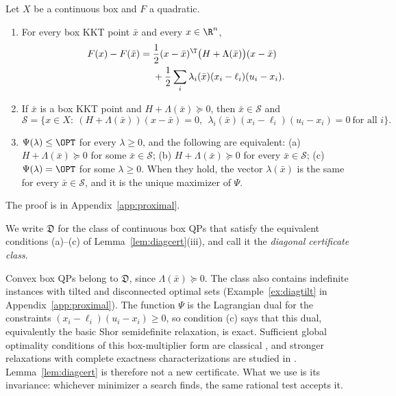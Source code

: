 \begin{lemma}\label{lem:diagcert}
Let $X$ be a continuous box and $F$ a quadratic.
\begin{enumerate}
\item[(i)] For every box KKT point $\bar x$ and every $x\in\R^n$,
\begin{equation}\label{eq:diagid}
\begin{split}
F(x)-F(\bar x)={}&\frac12(x-\bar x)^{\T}\bigl(H+\Lambda(\bar x)\bigr)(x-\bar x)\\
&+\frac12\sum_i\lambda_i(\bar x)(x_i-\ell_i)(u_i-x_i).
\end{split}
\end{equation}
\item[(ii)] If $\bar x$ is a box KKT point and $H+\Lambda(\bar x)\succeq0$,
then $\bar x\in\mathcal S$ and
\begin{equation}\label{eq:diagset}
\mathcal S=\bigl\{x\in X:\ (H+\Lambda(\bar x))(x-\bar x)=0,\ \
\lambda_i(\bar x)(x_i-\ell_i)(u_i-x_i)=0\ \text{for all }i\bigr\}.
\end{equation}
\item[(iii)] $\Psi(\lambda)\le\OPT$ for every $\lambda\ge0$, and the
following are equivalent: (a) $H+\Lambda(\bar x)\succeq0$ for some
$\bar x\in\mathcal S$; (b) $H+\Lambda(\bar x)\succeq0$ for every
$\bar x\in\mathcal S$; (c) $\Psi(\lambda)=\OPT$ for some $\lambda\ge0$. When
they hold, the vector $\lambda(\bar x)$ is the same for every
$\bar x\in\mathcal S$, and it is the unique maximizer of $\Psi$.
\end{enumerate}
The proof is in Appendix~\ref{app:proximal}.
\end{lemma}

We write $\mathfrak D$ for the class of continuous box QPs that satisfy the
equivalent conditions (a)--(c) of Lemma~\ref{lem:diagcert}(iii), and call it
the \emph{diagonal certificate class}.

\begin{remark}\label{rem:shor}
Convex box QPs belong to $\mathfrak D$, since $\Lambda(\bar x)\succeq0$. The
class also contains indefinite instances with tilted and disconnected optimal
sets (Example~\ref{ex:diagtilt} in Appendix~\ref{app:proximal}). The function
$\Psi$ is the Lagrangian dual for the constraints
$(x_i-\ell_i)(u_i-x_i)\ge0$, so condition (c) says that this dual,
equivalently the basic Shor semidefinite relaxation, is exact. Sufficient
global optimality conditions of this box-multiplier form are classical
\cite{JeyakumarRubinovWu2006,LiWuQuan2015}, and stronger relaxations with
complete exactness characterizations are studied in \cite{QiuYildirim2024}.
Lemma~\ref{lem:diagcert} is therefore not a new certificate. What we use is
its invariance: whichever minimizer a search finds, the same rational test
accepts it.
\end{remark}

